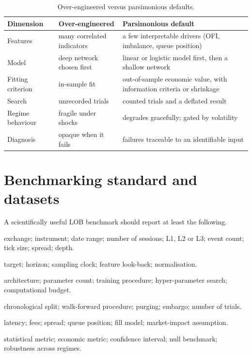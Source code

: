 \begin{table}[!htbp]
\centering\footnotesize
\caption{Over-engineered versus parsimonious defaults.}
\label{tab:checklist}
\begin{tabularx}{\linewidth}{l>{\raggedright\arraybackslash}X>{\raggedright\arraybackslash}X}
\toprule
Dimension & Over-engineered & Parsimonious default \\
\midrule
Features & many correlated indicators & a few interpretable drivers (OFI, imbalance, queue position) \\
Model & deep network chosen first & linear or logistic model first, then a shallow network \\
Fitting criterion & in-sample fit & out-of-sample economic value, with information criteria or shrinkage \\
Search & unrecorded trials & counted trials and a deflated result \\
Regime behaviour & fragile under shocks & degrades gracefully; gated by volatility \\
Diagnosis & opaque when it fails & failures traceable to an identifiable input \\
\bottomrule
\end{tabularx}
\end{table}

\section{Benchmarking standard and datasets}
\label{sec:benchmark}

A scientifically useful LOB benchmark should report at least the following.
\begin{description}[leftmargin=1.5em,style=nextline]
\item[Data] exchange; instrument; date range; number of sessions; L1, L2 or L3; event count; tick
  size; spread; depth.
\item[Prediction] target; horizon; sampling clock; feature look-back; normalisation.
\item[Model] architecture; parameter count; training procedure; hyper-parameter search;
  computational budget.
\item[Validation] chronological split; walk-forward procedure; purging; embargo; number of trials.
\item[Execution] latency; fees; spread; queue position; fill model; market-impact assumption.
\item[Results] statistical metric; economic metric; confidence interval; null benchmark;
  robustness across regimes.
\end{description}

